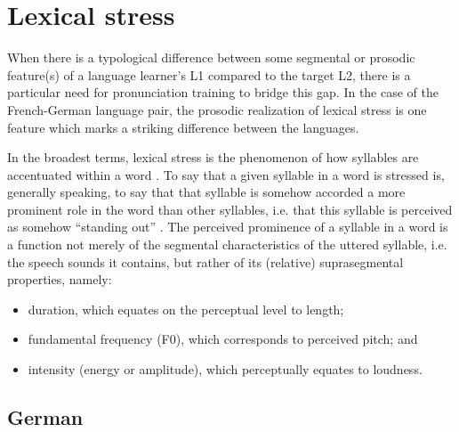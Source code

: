 	
 \section{Lexical stress}
 \label{sec:bkgd:stress}
		When there is a typological difference between some segmental or prosodic feature(s) of a language learner's L1 compared to the target L2, there is a particular need for pronunciation training to bridge this gap. In the case of the French-German language pair, the prosodic realization of lexical stress is one feature which marks a striking difference between the languages.
		
			In the broadest terms, lexical stress is the phenomenon of how syllables are accentuated within a word  \citep{Cutler2005}. To say that a given syllable in a word is stressed is, generally speaking, to say that that syllable is somehow accorded a more prominent role in the word than other syllables, i.e. that this syllable is perceived as somehow ``standing out'' \citep{Dogil1999}.
			The perceived prominence of a syllable in a word is a function not merely of the segmental characteristics of the uttered syllable, i.e. the speech sounds it contains, but rather of its (relative) suprasegmental properties, namely: %
			\begin{itemize}
			\item duration, which equates on the perceptual level to length; %
			\item fundamental frequency (F0), which corresponds to perceived pitch; and
			\item intensity (energy or amplitude), which perceptually equates to loudness.
			\end{itemize}

	\subsection{German}
	\label{sec:stress:german}
	
		
		
